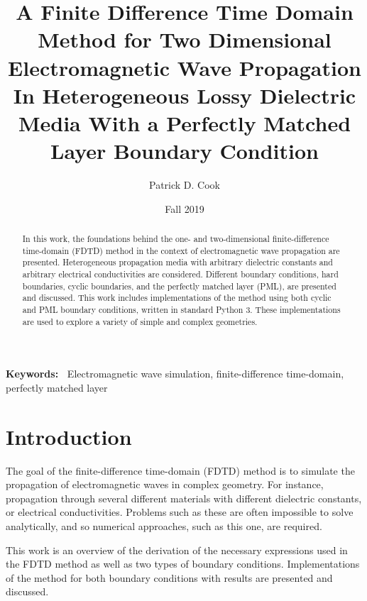 \documentclass[12pt,twocolumn]{article}
\providecommand{\keywords}[1]{\textbf{\textbf{Keywords:~}} #1}
\begin{document}
\title{A Finite Difference Time Domain Method for Two Dimensional Electromagnetic Wave Propagation In Heterogeneous Lossy Dielectric Media With a Perfectly Matched Layer Boundary Condition}
\author{Patrick D. Cook}
\date{Fall 2019}
\begin{titlingpage}
\maketitle
\begin{abstract}
In this work, the foundations behind the one- and two-dimensional finite-difference time-domain (FDTD) method in the context of electromagnetic wave propagation are presented. Heterogeneous propagation media with arbitrary dielectric constants and arbitrary electrical conductivities are considered. Different boundary conditions, hard boundaries, cyclic boundaries, and the perfectly matched layer (PML), are presented and discussed. This work includes implementations of the method using both cyclic and PML boundary conditions, written in standard Python 3. These implementations are used to explore a variety of simple and complex geometries.
\end{abstract}

\keywords{Electromagnetic wave simulation, finite-difference time-domain, perfectly matched layer}
\end{titlingpage}
\newpage
\section{Introduction}
The goal of the finite-difference time-domain (FDTD) method is to simulate the propagation of electromagnetic waves in complex geometry. For instance, propagation through several different materials with different dielectric constants, or electrical conductivities. Problems such as these are often impossible to solve analytically, and so numerical approaches, such as this one, are required.

This work is an overview of the derivation of the necessary expressions used in the FDTD method as well as two types of boundary conditions. Implementations of the method for both boundary conditions with results are presented and discussed.
\end{document}
